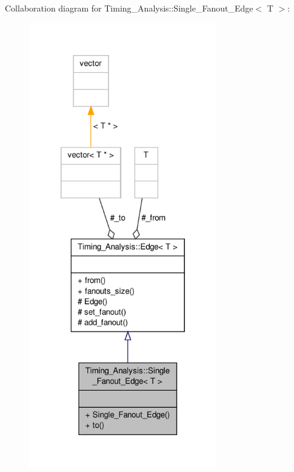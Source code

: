 Collaboration diagram for Timing\-\_\-\-Analysis\-:\-:Single\-\_\-\-Fanout\-\_\-\-Edge$<$ T $>$\-:\nopagebreak
\begin{figure}[H]
\begin{center}
\leavevmode
\includegraphics[height=550pt]{classTiming__Analysis_1_1Single__Fanout__Edge__coll__graph}
\end{center}
\end{figure}
